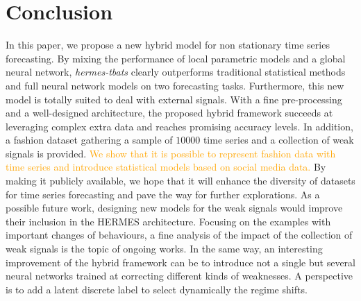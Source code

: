 \documentclass[10pt]{article} %
\newcommand{\numberts}{10000}
\begin{document}
\section{Conclusion}
\label{sec:conclusion}
In this paper, we propose a new hybrid model for non stationary time series forecasting. By mixing the performance of local parametric models and a global neural network, \textit{hermes-tbats} clearly outperforms traditional statistical methods and full neural network models on two forecasting tasks. Furthermore, this new model is totally suited to deal with external signals. With a fine pre-processing and a well-designed architecture, the proposed hybrid framework succeeds at leveraging complex extra data and reaches promising accuracy levels. In addition, a fashion dataset gathering a sample of $\numberts$ time series and a collection of weak signals is provided. \textcolor{orange}{We show that it is possible to represent fashion data with time series and introduce statistical models based on social media data.} By making it publicly available, we hope that it will enhance the diversity of datasets for time series forecasting and pave the way for further explorations.
As a possible future work, designing new models for the weak signals would improve their inclusion  in the HERMES architecture. Focusing on the examples with important changes of behaviours, a fine analysis of the impact of the collection of weak signals is the topic of ongoing works. In the same way, an interesting improvement of the hybrid framework can be to introduce not a single but several neural networks trained at correcting different kinds of weaknesses. A perspective is to add a latent discrete label to select dynamically the regime shifts. 




\appendix
\end{document}

